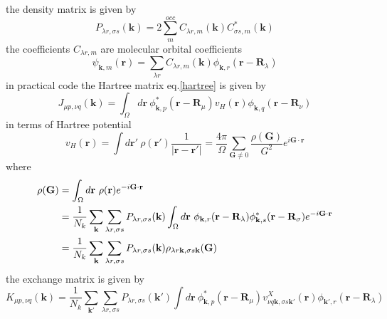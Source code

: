 \documentclass{article}
\begin{document}
            the density matrix is given by
            \begin{equation}
                P_{\lambda r,\sigma s}(\textbf{k}) = 2\sum_m^{occ}C_{\lambda r,m}(\textbf{k})C_{\sigma s,m}^*(\textbf{k})
            \end{equation}
            the coefficients $C_{\lambda r,m}$ are molecular orbital coefficients
            \begin{equation}
                \psi_{\textbf{k},m}(\textbf{r}) = \sum_{\lambda r}C_{\lambda r,m}(\textbf{k})\phi_{\textbf{k},r}(\textbf{r}-\textbf{R}_{\lambda})
            \end{equation} 
            in practical code the Hartree matrix eq.\eqref{hartree} is given by
            \begin{equation}
                J_{\mu p,\nu q}(\textbf{k}) = \int_{\Omega}d\textbf{r}\ \phi_{\textbf{k},p}^*(\textbf{r}-\textbf{R}_{\mu})v_H(\textbf{r})\phi_{\textbf{k},q}(\textbf{r}-\textbf{R}_{\nu})\label{hartree_code}
            \end{equation}
            in terms of Hartree potential
            \begin{equation}
                v_H(\textbf{r}) = \int d\textbf{r}'\ \rho(\textbf{r}')\frac{1}{\left|\textbf{r}-\textbf{r}'\right|} = \frac{4\pi}{\Omega}\sum_{\textbf{G}\neq 0}\frac{\rho(\textbf{G})}{G^2}e^{i\textbf{G}\cdot\textbf{r}}
            \end{equation}
            where
            \begin{align}
                \rho(\textbf{G}) &= \int_{\Omega}d\textbf{r}\ \rho(\textbf{r})e^{-i\textbf{G}\cdot\textbf{r}}\notag\\
                &= \frac{1}{N_k}\sum_{\textbf{k}}\sum_{\lambda r,\sigma s}P_{\lambda r,\sigma s}(\textbf{k})\int_{\Omega}d\textbf{r}\ \phi_{\textbf{k},r}(\textbf{r}-\textbf{R}_{\lambda})\phi_{\textbf{k},s}^*(\textbf{r}-\textbf{R}_{\sigma})e^{-i\textbf{G}\cdot\textbf{r}}\notag\\
                &= \frac{1}{N_k}\sum_{\textbf{k}}\sum_{\lambda r,\sigma s}P_{\lambda r,\sigma s}(\textbf{k})\rho_{\lambda r\textbf{k},\sigma s\textbf{k}}(\textbf{G})
            \end{align}
            the exchange matrix is given by
            \begin{equation}
                K_{\mu p,\nu q}(\textbf{k}) = \frac{1}{N_k}\sum_{\textbf{k}'}\sum_{\lambda r,\sigma s}P_{\lambda r,\sigma s}(\textbf{k}')\int d\textbf{r}\ \phi_{\textbf{k},p}^*(\textbf{r}-\textbf{R}_{\mu})v_{\nu q\textbf{k},\sigma s\textbf{k}'}^X(\textbf{r})\phi_{\textbf{k}',r}(\textbf{r}-\textbf{R}_{\lambda})
            \end{equation}
\end{document}
